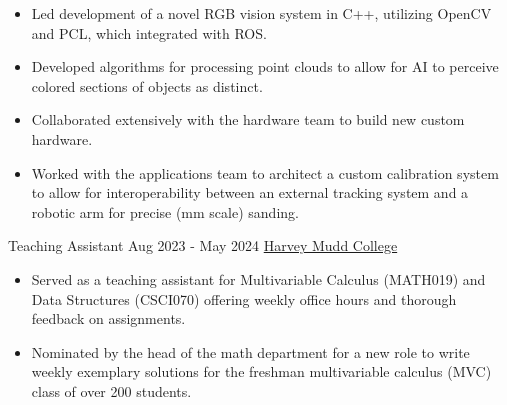 \documentclass[9pt]{resume}
\begin{document}
\begin{experiencelist}
{\begin{itemize}[noitemsep, topsep=1pt]
                \item Led development of a novel RGB vision system in C++, utilizing OpenCV and PCL, which integrated with ROS.
                \item Developed algorithms for processing point clouds to allow for AI to perceive colored sections of objects as distinct.
                \item Collaborated extensively with the hardware team to build new custom hardware.
                \item Worked with the applications team to architect a custom calibration system to allow for interoperability between an external tracking system and a robotic arm for precise (mm scale) sanding.
            \end{itemize}}
        \experience 
            {Teaching Assistant}
            {Aug 2023 - May 2024}
            {\href{https://www.hmc.edu/}{Harvey Mudd College}}
            {\begin{itemize}[noitemsep, topsep=1pt] 
                \item Served as a teaching assistant for Multivariable Calculus (MATH019) and Data Structures (CSCI070) offering weekly office hours and thorough feedback on assignments.
                \item Nominated by the head of the math department for a new role to write weekly exemplary solutions for the freshman multivariable calculus (MVC) class of over 200 students.
            \end{itemize}}
    \end{experiencelist}
\end{document}
